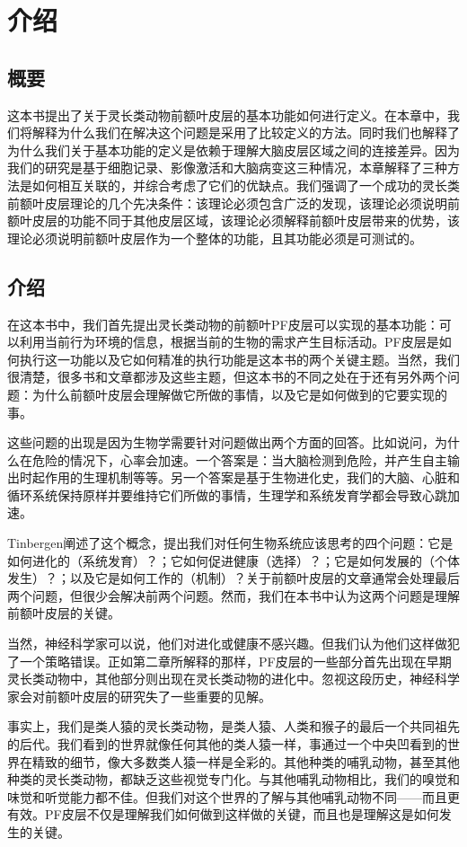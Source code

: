 

\chapter{介绍}

\section{概要}
这本书提出了关于灵长类动物前额叶皮层的基本功能如何进行定义。在本章中，我们将解释为什么我们在解决这个问题是采用了比较定义的方法。同时我们也解释了为什么我们关于基本功能的定义是依赖于理解大脑皮层区域之间的连接差异。因为我们的研究是基于细胞记录、影像激活和大脑病变这三种情况，本章解释了三种方法是如何相互关联的，并综合考虑了它们的优缺点。我们强调了一个成功的灵长类前额叶皮层理论的几个先决条件：该理论必须包含广泛的发现，该理论必须说明前额叶皮层的功能不同于其他皮层区域，该理论必须解释前额叶皮层带来的优势，该理论必须说明前额叶皮层作为一个整体的功能，且其功能必须是可测试的。

\section{介绍}
在这本书中，我们首先提出灵长类动物的前额叶PF皮层可以实现的基本功能：可以利用当前行为环境的信息，根据当前的生物的需求产生目标活动。PF皮层是如何执行这一功能以及它如何精准的执行功能是这本书的两个关键主题。当然，我们很清楚，很多书和文章都涉及这些主题，但这本书的不同之处在于还有另外两个问题：为什么前额叶皮层会理解做它所做的事情，以及它是如何做到的它要实现的事。
\par 
这些问题的出现是因为生物学需要针对问题做出两个方面的回答。比如说问，为什么在危险的情况下，心率会加速。一个答案是：当大脑检测到危险，并产生自主输出时起作用的生理机制等等。另一个答案是基于生物进化史，我们的大脑、心脏和循环系统保持原样并要维持它们所做的事情，生理学和系统发育学都会导致心跳加速。
\par 
Tinbergen阐述了这个概念，提出我们对任何生物系统应该思考的四个问题：它是如何进化的（系统发育）？；它如何促进健康（选择）？；它是如何发展的（个体发生）？；以及它是如何工作的（机制）？关于前额叶皮层的文章通常会处理最后两个问题，但很少会解决前两个问题。然而，我们在本书中认为这两个问题是理解前额叶皮层的关键。
\par 
当然，神经科学家可以说，他们对进化或健康不感兴趣。但我们认为他们这样做犯了一个策略错误。正如第二章所解释的那样，PF皮层的一些部分首先出现在早期灵长类动物中，其他部分则出现在灵长类动物的进化中。忽视这段历史，神经科学家会对前额叶皮层的研究失了一些重要的见解。
\par 
事实上，我们是类人猿的灵长类动物，是类人猿、人类和猴子的最后一个共同祖先的后代。我们看到的世界就像任何其他的类人猿一样，事通过一个中央凹看到的世界在精致的细节，像大多数类人猿一样是全彩的。其他种类的哺乳动物，甚至其他种类的灵长类动物，都缺乏这些视觉专门化。与其他哺乳动物相比，我们的嗅觉和味觉和听觉能力都不佳。但我们对这个世界的了解与其他哺乳动物不同——而且更有效。PF皮层不仅是理解我们如何做到这样做的关键，而且也是理解这是如何发生的关键。

